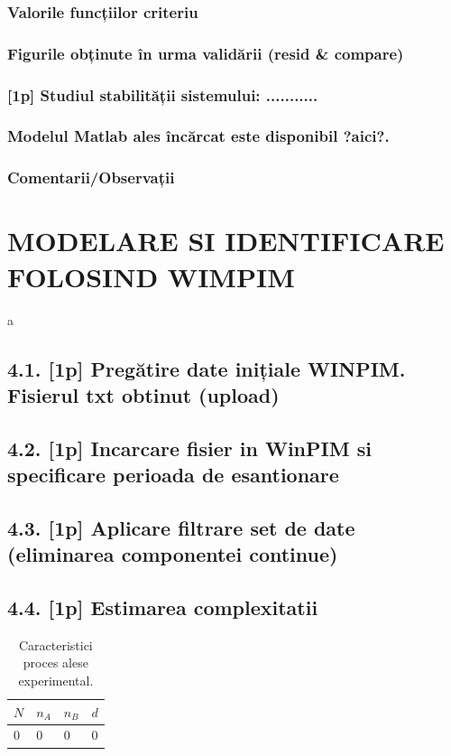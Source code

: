 \documentclass[12pt,english]{article}
\begin{document}
\subsubsection { Valorile funcțiilor criteriu }
\subsubsection { Figurile obținute în urma validării (resid \& compare) }
\subsubsection { [1p] Studiul stabilității sistemului: ........... }
\subsubsection { Modelul Matlab ales încărcat este disponibil ?aici?. }
\subsubsection { Comentarii/Observații }

\section { MODELARE SI IDENTIFICARE FOLOSIND WIMPIM }
a
\subsection {4.1. [1p] Pregătire date inițiale WINPIM. Fisierul txt obtinut (upload) }
\subsection {4.2. [1p] Incarcare fisier in WinPIM si specificare perioada de esantionare }
\subsection {4.3. [1p] Aplicare filtrare set de date (eliminarea componentei continue) }
\subsection {4.4. [1p] Estimarea complexitatii}
\begin{table}[h!]
  \centering
    \begin{tabular}{|l|l|l|l|}
      \hline
      $N$ & $n_A$ & $n_B$ & $d$ \\
      \hline
      0 & 0 & 0 & 0 \\
      \hline
    \end{tabular}
    \caption{Caracteristici proces alese experimental.}
\end{table}
\end{document}
